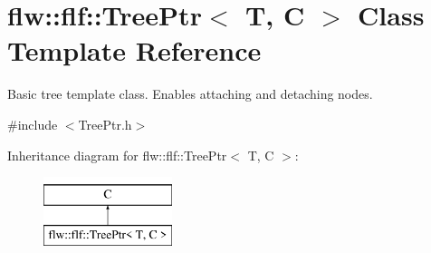\hypertarget{classflw_1_1flf_1_1TreePtr}{}\section{flw\+:\+:flf\+:\+:Tree\+Ptr$<$ T, C $>$ Class Template Reference}
\label{classflw_1_1flf_1_1TreePtr}


Basic tree template class. Enables attaching and detaching nodes.  




{\ttfamily \#include $<$Tree\+Ptr.\+h$>$}

Inheritance diagram for flw\+:\+:flf\+:\+:Tree\+Ptr$<$ T, C $>$\+:\begin{figure}[H]
\begin{center}
\leavevmode
\includegraphics[height=2.000000cm]{classflw_1_1flf_1_1TreePtr}
\end{center}
\end{figure}
